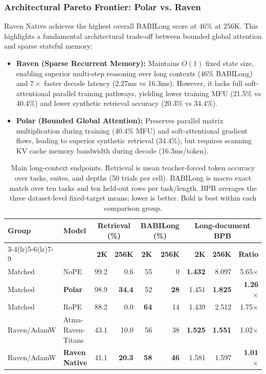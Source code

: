 \documentclass{article} %
\begin{document}
\subsubsection{Architectural Pareto Frontier: Polar vs. Raven}
Raven Native achieves the highest overall BABILong score at 46\% at 256K. This highlights a fundamental architectural trade-off between bounded global attention and sparse stateful memory:
\begin{itemize}
    \item \textbf{Raven (Sparse Recurrent Memory):} Maintains $O(1)$ fixed state size, enabling superior multi-step reasoning over long contexts (46\% BABILong) and $7\times$ faster decode latency (2.27ms vs 16.3ms). However, it lacks full soft-attentional parallel training pathways, yielding lower training MFU (21.5\% vs 40.4\%) and lower synthetic retrieval accuracy (20.3\% vs 34.4\%).
    \item \textbf{Polar (Bounded Global Attention):} Preserves parallel matrix multiplication during training (40.4\% MFU) and soft-attentional gradient flows, leading to superior synthetic retrieval (34.4\%), but requires scanning KV cache memory bandwidth during decode (16.3ms/token).
\end{itemize}

\begin{table}[t]
\centering
\small
\setlength{\tabcolsep}{4.2pt}
\begin{tabular}{llrrrrrrr}
\toprule
\textbf{Group} & \textbf{Model} & \multicolumn{2}{c}{\textbf{Retrieval (\%)}} & \multicolumn{2}{c}{\textbf{BABILong (\%)}} & \multicolumn{3}{c}{\textbf{Long-document BPB}} \\
\cmidrule(lr){3-4}\cmidrule(lr){5-6}\cmidrule(lr){7-9}
 & & \textbf{2K} & \textbf{256K} & \textbf{2K} & \textbf{256K} & \textbf{2K} & \textbf{256K} & \textbf{Ratio} \\
\midrule
Matched & NoPE & 99.2 & 0.6 & 55 & 0 & \textbf{1.432} & 8.097 & 5.65$\times$ \\
Matched & \textbf{Polar} & 98.9 & \textbf{34.4} & 52 & \textbf{28} & 1.451 & \textbf{1.825} & \textbf{1.26$\times$} \\
Matched & RoPE & 88.2 & 0.0 & \textbf{64} & 14 & 1.439 & 2.512 & 1.75$\times$ \\
\midrule
Raven/AdamW & Atma-Raven-Titans & 43.1 & 10.0 & 56 & 38 & \textbf{1.525} & \textbf{1.551} & 1.02$\times$ \\
Raven/AdamW & \textbf{Raven Native} & 41.1 & \textbf{20.3} & \textbf{58} & \textbf{46} & 1.581 & 1.597 & \textbf{1.01$\times$} \\
\bottomrule
\end{tabular}
\caption{Main long-context endpoints. Retrieval is mean teacher-forced token accuracy over tasks, suites, and depths (50 trials per cell). BABILong is macro exact match over ten tasks and ten held-out rows per task/length. BPB averages the three dataset-level fixed-target means; lower is better. Bold is best within each comparison group.}
\label{table:long_context_summary}
\end{table}
\end{document}
